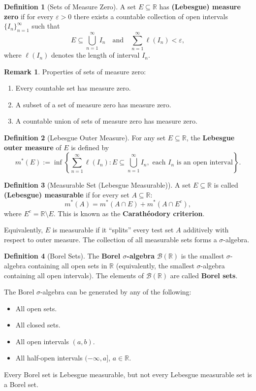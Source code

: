 \documentclass[12pt,a4paper]{article}
\theoremstyle{definition}
\newtheorem{definition}{Definition}[section]
\newtheorem{remark}[theorem]{Remark}
\newcommand{\R}{\mathbb{R}}
\newcommand{\eps}{\varepsilon}
\begin{document}
\begin{definition}[Sets of Measure Zero]
A set $E \subseteq \R$ has \textbf{(Lebesgue) measure zero} if for every $\eps > 0$ there exists a countable collection of open intervals $\{I_n\}_{n=1}^\infty$ such that
\[
    E \subseteq \bigcup_{n=1}^\infty I_n \quad \text{and} \quad \sum_{n=1}^\infty \ell(I_n) < \eps,
\]
where $\ell(I_n)$ denotes the length of interval $I_n$.
\end{definition}

\begin{remark}
Properties of sets of measure zero:
\begin{enumerate}[label=(\roman*)]
    \item Every countable set has measure zero.
    \item A subset of a set of measure zero has measure zero.
    \item A countable union of sets of measure zero has measure zero.
\end{enumerate}
\end{remark}

\begin{definition}[Lebesgue Outer Measure]
For any set $E \subseteq \R$, the \textbf{Lebesgue outer measure} of $E$ is defined by
\[
    m^*(E) := \inf\left\{\sum_{n=1}^\infty \ell(I_n) : E \subseteq \bigcup_{n=1}^\infty I_n, \text{ each } I_n \text{ is an open interval}\right\}.
\]
\end{definition}

\begin{definition}[Measurable Set (Lebesgue Measurable)]
A set $E \subseteq \R$ is called \textbf{(Lebesgue) measurable} if for every set $A \subseteq \R$:
\[
    m^*(A) = m^*(A \cap E) + m^*(A \cap E^c),
\]
where $E^c = \R \setminus E$. This is known as the \textbf{Carath\'eodory criterion}.

Equivalently, $E$ is measurable if it ``splits'' every test set $A$ additively with respect to outer measure. The collection of all measurable sets forms a $\sigma$-algebra.
\end{definition}

\begin{definition}[Borel Sets]
The \textbf{Borel $\sigma$-algebra} $\mathcal{B}(\R)$ is the smallest $\sigma$-algebra containing all open sets in $\R$ (equivalently, the smallest $\sigma$-algebra containing all open intervals). The elements of $\mathcal{B}(\R)$ are called \textbf{Borel sets}.

The Borel $\sigma$-algebra can be generated by any of the following:
\begin{itemize}
    \item All open sets.
    \item All closed sets.
    \item All open intervals $(a,b)$.
    \item All half-open intervals $(-\infty, a]$, $a \in \R$.
\end{itemize}

Every Borel set is Lebesgue measurable, but not every Lebesgue measurable set is a Borel set.
\end{definition}
\end{document}
